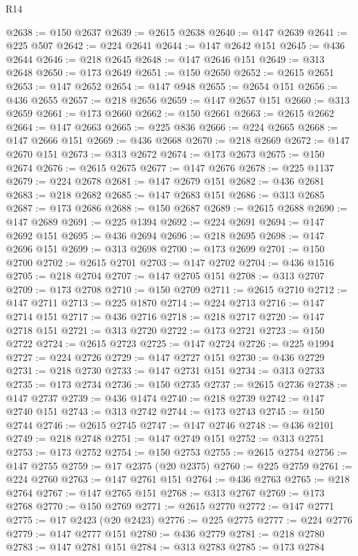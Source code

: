 \begin{lexlean}{R14}
\begin{coremodule}
@2638 := @150 @2637
@2639 := @2615 @2638
@2640 := @147 @2639
@2641 := @225 @507
@2642 := @224 @2641
@2644 := @147 @2642 @151
@2645 := @436 @2644
@2646 := @218 @2645
@2648 := @147 @2646 @151
@2649 := @313 @2648
@2650 := @173 @2649
@2651 := @150 @2650
@2652 := @2615 @2651
@2653 := @147 @2652
@2654 := @147 @948
@2655 := @2654 @151
@2656 := @436 @2655
@2657 := @218 @2656
@2659 := @147 @2657 @151
@2660 := @313 @2659
@2661 := @173 @2660
@2662 := @150 @2661
@2663 := @2615 @2662
@2664 := @147 @2663
@2665 := @225 @836
@2666 := @224 @2665
@2668 := @147 @2666 @151
@2669 := @436 @2668
@2670 := @218 @2669
@2672 := @147 @2670 @151
@2673 := @313 @2672
@2674 := @173 @2673
@2675 := @150 @2674
@2676 := @2615 @2675
@2677 := @147 @2676
@2678 := @225 @1137
@2679 := @224 @2678
@2681 := @147 @2679 @151
@2682 := @436 @2681
@2683 := @218 @2682
@2685 := @147 @2683 @151
@2686 := @313 @2685
@2687 := @173 @2686
@2688 := @150 @2687
@2689 := @2615 @2688
@2690 := @147 @2689
@2691 := @225 @1394
@2692 := @224 @2691
@2694 := @147 @2692 @151
@2695 := @436 @2694
@2696 := @218 @2695
@2698 := @147 @2696 @151
@2699 := @313 @2698
@2700 := @173 @2699
@2701 := @150 @2700
@2702 := @2615 @2701
@2703 := @147 @2702
@2704 := @436 @1516
@2705 := @218 @2704
@2707 := @147 @2705 @151
@2708 := @313 @2707
@2709 := @173 @2708
@2710 := @150 @2709
@2711 := @2615 @2710
@2712 := @147 @2711
@2713 := @225 @1870
@2714 := @224 @2713
@2716 := @147 @2714 @151
@2717 := @436 @2716
@2718 := @218 @2717
@2720 := @147 @2718 @151
@2721 := @313 @2720
@2722 := @173 @2721
@2723 := @150 @2722
@2724 := @2615 @2723
@2725 := @147 @2724
@2726 := @225 @1994
@2727 := @224 @2726
@2729 := @147 @2727 @151
@2730 := @436 @2729
@2731 := @218 @2730
@2733 := @147 @2731 @151
@2734 := @313 @2733
@2735 := @173 @2734
@2736 := @150 @2735
@2737 := @2615 @2736
@2738 := @147 @2737
@2739 := @436 @1474
@2740 := @218 @2739
@2742 := @147 @2740 @151
@2743 := @313 @2742
@2744 := @173 @2743
@2745 := @150 @2744
@2746 := @2615 @2745
@2747 := @147 @2746
@2748 := @436 @2101
@2749 := @218 @2748
@2751 := @147 @2749 @151
@2752 := @313 @2751
@2753 := @173 @2752
@2754 := @150 @2753
@2755 := @2615 @2754
@2756 := @147 @2755
@2759 := @17 @2375 (@20 @2375)
@2760 := @225 @2759
@2761 := @224 @2760
@2763 := @147 @2761 @151
@2764 := @436 @2763
@2765 := @218 @2764
@2767 := @147 @2765 @151
@2768 := @313 @2767
@2769 := @173 @2768
@2770 := @150 @2769
@2771 := @2615 @2770
@2772 := @147 @2771
@2775 := @17 @2423 (@20 @2423)
@2776 := @225 @2775
@2777 := @224 @2776
@2779 := @147 @2777 @151
@2780 := @436 @2779
@2781 := @218 @2780
@2783 := @147 @2781 @151
@2784 := @313 @2783
@2785 := @173 @2784

\end{coremodule}
\end{lexlean}
